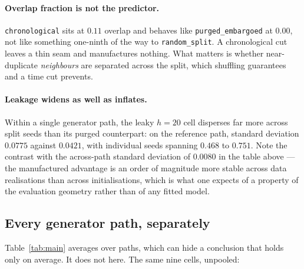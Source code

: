 \documentclass[11pt,a4paper]{article}
\begin{document}
\paragraph{Overlap fraction is not the predictor.} \texttt{chronological} sits at
$0.11$ overlap and behaves like \texttt{purged\_embargoed} at $0.00$, not like
something one-ninth of the way to \texttt{random\_split}. A chronological cut
leaves a thin seam and manufactures nothing. What matters is whether
near-duplicate \emph{neighbours} are separated across the split, which shuffling
guarantees and a time cut prevents.

\paragraph{Leakage widens as well as inflates.} Within a single generator path,
the leaky $h=20$ cell disperses far more across split seeds than its purged
counterpart: on the reference path, standard deviation $0.0775$ against $0.0421$,
with individual seeds spanning $0.468$ to $0.751$. Note the contrast with the
across-path standard deviation of $0.0080$ in the table above --- the manufactured
advantage is an order of magnitude more stable across data realisations than
across initialisations, which is what one expects of a property of the evaluation
geometry rather than of any fitted model.

\subsection{Every generator path, separately}
\label{sec:perpath}

Table~\ref{tab:main} averages over paths, which can hide a conclusion that holds
only on average. It does not here. The same nine cells, unpooled:
\end{document}
